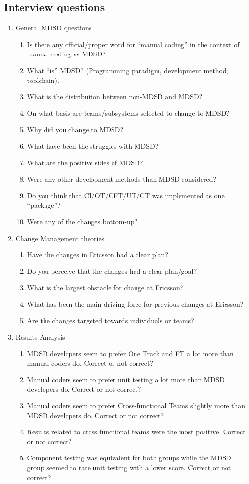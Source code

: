 \documentclass[final_report_innit.tex]{subfiles}
\begin{document}
\subsection{Interview questions}
\begin{enumerate}
	\item General MDSD questions
	\begin{enumerate}
		\item Is there any official/proper word for ``manual coding'' in the context of manual coding vs MDSD?
		\item What ``is'' MDSD? (Programming paradigm, development method, toolchain).
		\item What is the distribution between non-MDSD and MDSD?
		\item On what basis are teams/subsystems selected to change to MDSD?
		\item Why did you change to MDSD?
		\item What have been the struggles with MDSD?
		\item What are the positive sides of MDSD?
		\item Were any other development methods than MDSD considered?
		\item Do you think that CI/OT/CFT/UT/CT was implemented as one ``package''?
		\item Were any of the changes bottom-up?
	\end{enumerate}
	\item Change Management theories
	\begin{enumerate}
		\item Have the changes in Ericsson had a clear plan? 
		\item Do you perceive that the changes had a clear plan/goal?
		\item What is the largest obstacle for change at Ericsson?
		\item What has been the main driving force for previous changes at Ericsson?
		\item Are the changes targeted towards individuals or teams?
	\end{enumerate}
	\item Results Analysis
	\begin{enumerate}
		\item MDSD developers seem to prefer One Track and FT a lot more than manual coders do. Correct or not correct?
		\item Manual coders seem to prefer unit testing a lot more than MDSD developers do. Correct or not correct?
		\item Manual coders seem to prefer Cross-functional Teams slightly more than MDSD developers do. Correct or not correct?
		\item Results related to cross functional teams were the most positive. Correct or not correct?
		\item Component testing was equivalent for both groups while the MDSD group seemed to rate unit testing with a lower score. Correct or not correct?
	\end{enumerate}
\end{enumerate}
\end{document}
